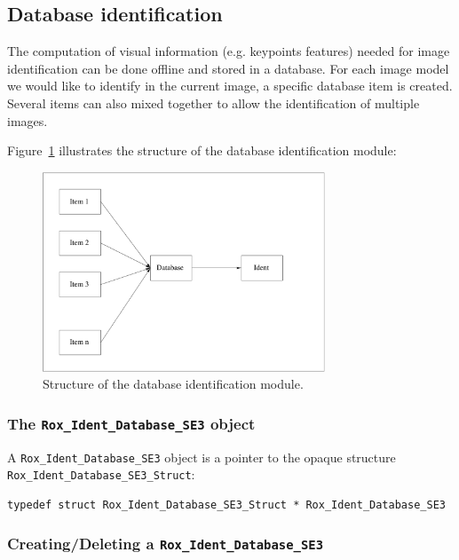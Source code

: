 \subsection{Database identification}
\label{sse:database}

The computation of visual information (e.g. keypoints features) needed
for image identification can be done offline and stored in a database.
For each image model we would like to identify in the current image, a
specific database item is created. Several items can also mixed
together to allow the identification of multiple images.

Figure~\ref{fig:ident_database} illustrates the structure of the database identification module:

\begin{figure}[H]
\centering
\includegraphics[width=0.75\textwidth]{vision/figures/ident_database} 
\caption{Structure of the database identification module.}
\label{fig:ident_database}
\end{figure}

\subsubsection{The {\tt Rox\_Ident\_Database\_SE3} object}
A \lstinline$Rox_Ident_Database_SE3$ object is a pointer to the opaque structure \lstinline$Rox_Ident_Database_SE3_Struct$: 

\begin{lstlisting}
typedef struct Rox_Ident_Database_SE3_Struct * Rox_Ident_Database_SE3
\end{lstlisting}

\subsubsection{Creating/Deleting a {\tt Rox\_Ident\_Database\_SE3}}

